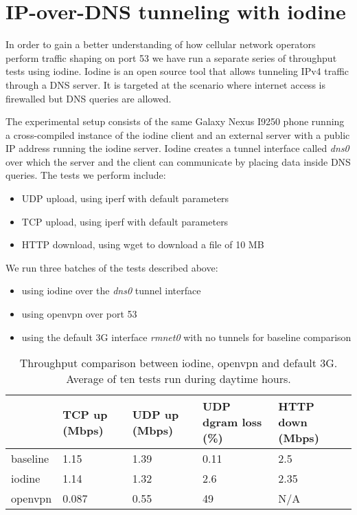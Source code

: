 
\section{IP-over-DNS tunneling with iodine}

In order to gain a better understanding of how cellular network operators perform traffic shaping on port 53 we have run a separate series of throughput tests using iodine. Iodine is an open source tool that allows tunneling IPv4 traffic through a DNS server. It is targeted at the scenario where internet access is firewalled but DNS queries are allowed.

The experimental setup consists of the same Galaxy Nexus I9250 phone running a cross-compiled instance of the iodine client and an external server with a public IP address running the iodine server. Iodine creates  a tunnel interface called \textit{dns0} over which the server and the client can communicate by placing data inside DNS queries. The tests we perform include:

\begin{itemize}
\item UDP upload, using iperf with default parameters
\item TCP upload, using iperf with default parameters
\item HTTP download, using wget to download a file of 10 MB
\end{itemize}

We run three batches of the tests described above:

\begin{itemize}
\item using iodine over the \textit{dns0} tunnel interface
\item using openvpn over port 53
\item using the default 3G interface \textit{rmnet0} with no tunnels for baseline comparison
\end{itemize}


\begin{center}
	\begin{table}[htb]
	\centering
	\begin{tabular}{ | l | l | l | l | l | }
	\hline
	& TCP up (Mbps) & UDP up (Mbps) & UDP dgram loss (\%) & HTTP down (Mbps) \\ \hline
	baseline & 1.15 & 1.39 &  0.11 & 2.5 \\ \hline
	iodine & 1.14 & 1.32 & 2.6 & 2.35 \\ \hline
	openvpn & 0.087 & 0.55 & 49 & N/A \\ \hline
	\end{tabular}
	\caption{Throughput comparison between iodine, openvpn and default 3G. Average of ten tests run during daytime hours.}
	\label{table:iodine}
	\end{table}
\end{center}
	
